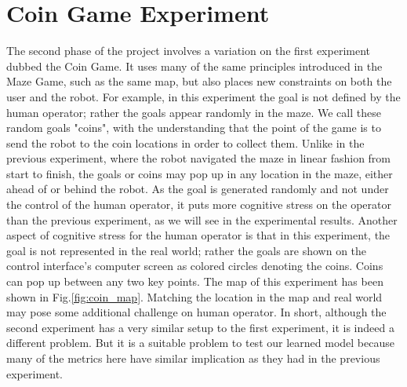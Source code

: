 \documentclass{sig-alternate}
\begin{document}
     
\section{Coin Game Experiment}

The second phase of the project involves a variation on the first
experiment dubbed the Coin Game. It uses many of the same principles
introduced in the Maze Game, such as the same map, but also places new
constraints on both the user and the robot. For example, in this
experiment the goal is not defined by the human operator; rather the
goals appear randomly in the maze. We call these random goals "coins",
with the understanding that the point of the game is to send the robot
to the coin locations in order to collect them. Unlike in the previous
experiment, where the robot navigated the maze in linear fashion from
start to finish, the goals or coins may pop up in any location in the
maze, either ahead of or behind the robot. As the goal is generated
randomly and not under the control of the human operator, it puts more
cognitive stress on the operator than the previous experiment, as we
will see in the experimental results. Another aspect of cognitive
stress for the human operator is that in this experiment, the goal is
not represented in the real world; rather the goals are shown on the
control interface's computer screen as colored circles denoting the
coins. Coins can pop up between any two key points. The map of this
experiment has been shown in Fig.\ref{fig:coin_map}. Matching the
location in the map and real world may pose some additional challenge
on human operator. In short, although the second experiment has a very
similar setup to the first experiment, it is indeed a different
problem. But it is a suitable problem to test our learned model
because many of the metrics here have similar implication as they had
in the previous experiment.
\end{document}
